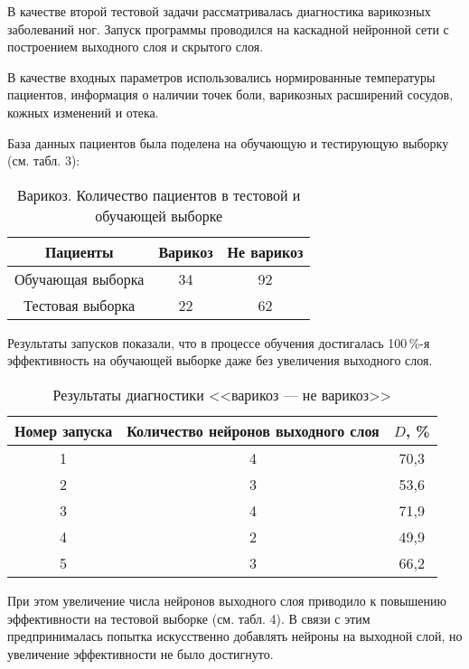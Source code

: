 В качестве второй тестовой задачи рассматривалась диагностика варикозных заболеваний ног. Запуск программы проводился на каскадной нейронной сети с построением выходного слоя и скрытого слоя.

В качестве входных параметров использовались нормированные температуры пациентов, информация о наличии точек боли, варикозных расширений сосудов, кожных изменений и отека.

База данных пациентов была поделена на обучающую и тестирующую выборку (см. табл. 3):

\begin{table}[h]
	\caption{Варикоз. Количество пациентов в тестовой и обучающей выборке}
	\centering
	\label{tabluar:tabResults}\small
	\begin{tabular}{|c|c|c|}
		
		\hline
		Пациенты & {Варикоз} &  {Не варикоз}  \\
		\hline
		Обучающая выборка & 34 & 92   \\
		\hline
		Тестовая выборка & 22 & 62   \\
		\hline
		
		
	\end{tabular}
\end{table}

Результаты запусков показали, что в процессе обучения достигалась 100\,\%-я эффективность на обучающей выборке даже без увеличения выходного слоя.

\begin{table}[h]
	\caption{Результаты диагностики <<варикоз --- не варикоз>>}
	\centering
	\label{tabluar:tabResults}\small
	\begin{tabular}{|c|c|c|}
		
		\hline
		{Номер запуска} & {Количество нейронов выходного слоя} &  $D$, \%  \\
		\hline
		1 & 4 & 70,3   \\
		\hline
		2 & 3 & 53,6   \\
		\hline
		3 & 4 & 71,9   \\
		\hline
		4 & 2 & 49,9   \\
		\hline
		
		5 & 3 & 66,2   \\
		\hline
		
		
	\end{tabular}
\end{table}

При этом увеличение числа нейронов выходного слоя приводило к повышению эффективности на тестовой выборке (см. табл. 4). В связи с этим предпринималась попытка искусственно добавлять нейроны на выходной слой, но увеличение эффективности не было достигнуто.

